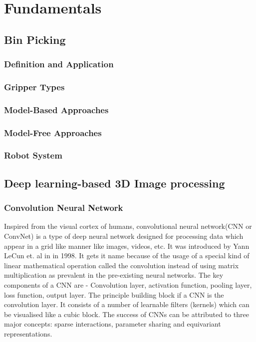 \section{Fundamentals}
\subsection{Bin Picking}
\subsubsection{Definition and Application}
\subsubsection{Gripper Types}
\subsubsection{Model-Based Approaches}
\subsubsection{Model-Free Approaches}
\subsubsection{Robot System}
\subsection{Deep learning-based 3D Image processing}
\subsubsection{Convolution Neural Network}
Inspired from the visual cortex of humans, convolutional neural network(\ac{CNN} or ConvNet) is a type of deep neural network designed for processing data which appear in a grid like manner like images, videos, etc.  It was introduced by Yann LeCun et. al in \cite{lecun1998gradient} in 1998.  It gets it name because of the usage of a special kind of linear mathematical operation called the convolution instead of using matrix multiplication as prevalent in the pre-existing neural networks. The key components of a \ac{CNN} are - Convolution layer, activation function, pooling layer, loss function, output layer. The principle building block if a CNN is the convolution layer. It consists of a number of learnable filters (kernels) which can be visualised like a cubic block. The success of \ac{CNN}s can be attributed to three major concepts: sparse interactions, parameter sharing and equivariant representations.
